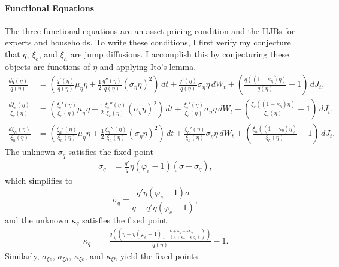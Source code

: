 \documentclass[12 pt, oneside]{article}
\theoremstyle{definition}
\theoremstyle{definition}
\theoremstyle{definition}
\begin{document}
\paragraph{Functional Equations}
The three functional equations are an asset pricing condition and the HJBs for experts and households. To write these conditions, I first verify my conjecture that $q$, $\xi_e$, and $\xi_h$ are jump diffusions. I accomplish this by conjecturing these objects are functions of $\eta$ and applying Ito's lemma.
\begin{align*}
  \frac{dq(\eta)}{q(\eta)} & = \left(\frac{q'(\eta)}{q(\eta)}\mu_\eta\eta + \frac{1}{2}\frac{q''(\eta)}{q(\eta)}(\sigma_\eta\eta)^2 \right)\, dt +\frac{ q'(\eta)}{q(\eta)}\sigma_\eta\eta\, dW_t + \left(\frac{q((1 - \kappa_\eta)\eta)}{q(\eta)} - 1\right)\, dJ_t,\\
  \frac{d\xi_e(\eta)}{\xi_e(\eta)} & = \left(\frac{\xi_e'(\eta)}{\xi_e(\eta)}\mu_\eta\eta + \frac{1}{2}\frac{\xi_e''(\eta)}{\xi_e(\eta)}(\sigma_\eta\eta)^2 \right)\, dt +\frac{ \xi_e'(\eta)}{\xi_e(\eta)}\sigma_\eta\eta\, dW_t + \left(\frac{\xi_e((1 - \kappa_\eta)\eta)}{\xi_e(\eta)} - 1\right)\, dJ_t,\\
  \frac{d\xi_h(\eta)}{\xi_h(\eta)} & = \left(\frac{\xi_h'(\eta)}{\xi_h(\eta)}\mu_\eta\eta + \frac{1}{2}\frac{\xi_h''(\eta)}{\xi_h(\eta)}(\sigma_\eta\eta)^2 \right)\, dt +\frac{ \xi_h'(\eta)}{\xi_h(\eta)}\sigma_\eta\eta\, dW_t + \left(\frac{\xi_h((1 - \kappa_\eta)\eta)}{\xi_h(\eta)} - 1\right)\, dJ_t.
\end{align*}
The unknown $\sigma_q$ satisfies the fixed point
\begin{align*}
\sigma_q & = \frac{q'}{q} \eta(\varphi_e - 1)(\sigma + \sigma_q),
\end{align*}
which simplifies to
\begin{equation}\label{eq:sigma q closed form}
  \sigma_q = \frac{q'\eta(\varphi_e - 1)\sigma}{q - q'\eta(\varphi_e - 1)},
\end{equation}
and the unknown $\kappa_q$ satisfies the fixed point
\begin{align}\label{eq:kappa q fixed point}
  \kappa_q & = \frac{q\left(\left(\eta - \eta(\varphi_e - 1)\frac{\kappa + \kappa_q - \kappa\kappa_q}{1 - (\kappa + \kappa_q - \kappa\kappa_q)}\right)\right)}{q(\eta)} - 1.
\end{align}
Similarly, $\sigma_{\xi e}$, $\sigma_{\xi h}$, $\kappa_{\xi e}$, and $\kappa_{\xi h}$ yield the fixed points
\end{document}
